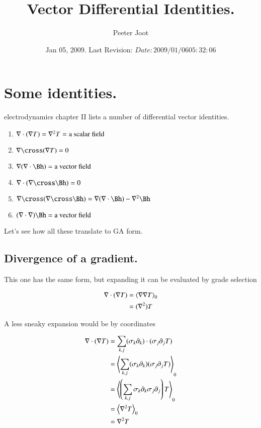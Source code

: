 \documentclass{article}
\title{ Vector Differential Identities. }
\author{Peeter Joot}
\date{ Jan 05, 2009.  Last Revision: $Date: 2009/01/06 05:32:06 $ }
\begin{document}
\maketitle{}
\section{ Some identities. }

\cite{feynman1963flp} electrodynamics chapter II lists a number of
differential vector identities.

\begin{enumerate}
\item $\nabla \cdot (\nabla T) = \nabla^2 T = \mbox{a scalar field}$
\item $\grad \cross (\grad T) = 0$
\item $\grad (\grad \cdot \Bh) = \mbox{a vector field}$
\item $\grad \cdot (\grad \cross \Bh) = 0$
\item $\grad \cross (\grad \cross \Bh) = \grad(\grad \cdot \Bh) - \grad^2 \Bh$
\item $(\grad \cdot \grad) \Bh = \mbox{a vector field}$
\end{enumerate}

Let's see how all these translate to GA form.

\subsection{ Divergence of a gradient. }

This one has the same form, but expanding it can be evaluated by grade
selection

\begin{align*}
\nabla \cdot (\nabla T) 
&= {\left\langle{{\nabla\nabla T}}\right\rangle}_{0} \\
&= (\nabla^2) T
\end{align*}

A less sneaky expansion would be by coordinates

\begin{align*}
\nabla \cdot (\nabla T) 
&= {\sum_{k,j} (\sigma_k \partial_k) \cdot (\sigma_j \partial_j T)} \\
&= {\left\langle{{\sum_{k,j} (\sigma_k \partial_k) (\sigma_j \partial_j T)}}\right\rangle}_{0} \\
&= {\left\langle{{\left(\sum_{k,j} \sigma_k \partial_k \sigma_j \partial_j\right) T}}\right\rangle}_{0} \\
&= {\left\langle{{\nabla^2 T}}\right\rangle}_{0} \\
&= \nabla^2 T \\
\end{align*}
\end{document}
